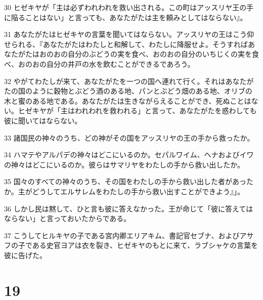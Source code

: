 \par 30 ヒゼキヤが「主は必ずわれわれを救い出される。この町はアッスリヤ王の手に陥ることはない」と言っても、あなたがたは主を頼みとしてはならない』。
\par 31 あなたがたはヒゼキヤの言葉を聞いてはならない。アッスリヤの王はこう仰せられる、『あなたがたはわたしと和解して、わたしに降服せよ。そうすればあなたがたはおのおの自分のぶどうの実を食べ、おのおの自分のいちじくの実を食べ、おのおの自分の井戸の水を飲むことができるであろう。
\par 32 やがてわたしが来て、あなたがたを一つの国へ連れて行く。それはあなたがたの国のように穀物とぶどう酒のある地、パンとぶどう畑のある地、オリブの木と蜜のある地である。あなたがたは生きながらえることができ、死ぬことはない。ヒゼキヤが「主はわれわれを救われる」と言って、あなたがたを惑わしても彼に聞いてはならない。
\par 33 諸国民の神々のうち、どの神がその国をアッスリヤの王の手から救ったか。
\par 34 ハマテやアルパデの神々はどこにいるのか。セパルワイム、ヘナおよびイワの神々はどこにいるのか。彼らはサマリヤをわたしの手から救い出したか。
\par 35 国々のすべての神々のうち、その国をわたしの手から救い出した者があったか。主がどうしてエルサレムをわたしの手から救い出すことができよう』」。
\par 36 しかし民は黙して、ひと言も彼に答えなかった。王が命じて「彼に答えてはならない」と言っておいたからである。
\par 37 こうしてヒルキヤの子である宮内卿エリアキム、書記官セブナ、およびアサフの子である史官ヨアは衣を裂き、ヒゼキヤのもとに来て、ラブシャケの言葉を彼に告げた。

\chapter{19}

